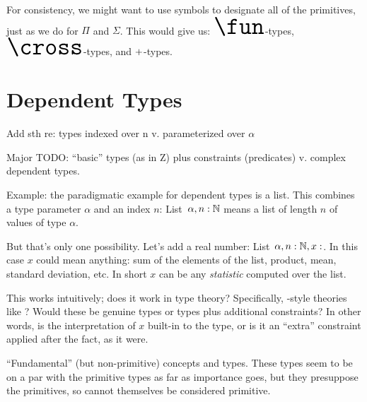 \begin{ednote}
  For consistency, we might want to use symbols to designate all of
  the primitives, just as we do for \(\Pi\) and \(\Sigma\).  This
  would give us: \(\Huge\fun\)-types, \(\Huge\cross\)-types, and
  \(\Huge +\)-types.
\end{ednote}


\section{Dependent Types}
\label{subs:quasiprim}

\begin{ednote}
  Add sth re:  types indexed over n v. parameterized over \(\alpha\)
\end{ednote}

\begin{ednote}
  Major TODO: ``basic'' types (as in Z) plus constraints (predicates)
  v. complex dependent types.

  Example: the paradigmatic example for dependent types is a list.
  This combines a type parameter \(\alpha\) and an index \(n\):
  List~\(\alpha, n:\mathbb{N}\) means a list of length \(n\) of values of
  type \(\alpha\).

  But that's only one possibility.  Let's add a real number:
  List~\(\alpha, n:\nat, x:\real\).  In this case \(x\) could mean
  anything: sum of the elements of the list, product, mean, standard
  deviation, etc.  In short \(x\) can be any \emph{statistic} computed
  over the list.

  This works intuitively; does it work in type theory?  Specifically,
  \ML{}-style theories like \HoTT?  Would these be genuine types or
  types plus additional constraints?  In other words, is the
  interpretation of \(x\) built-in to the type, or is it an ``extra''
  constraint applied after the fact, as it were.
\end{ednote}

\noindent ``Fundamental''%
(but non-primitive) concepts and types.  These types seem to be on a par
with the primitive types as far as importance goes, but they
presuppose the primitives, so cannot themselves be considered
primitive.

